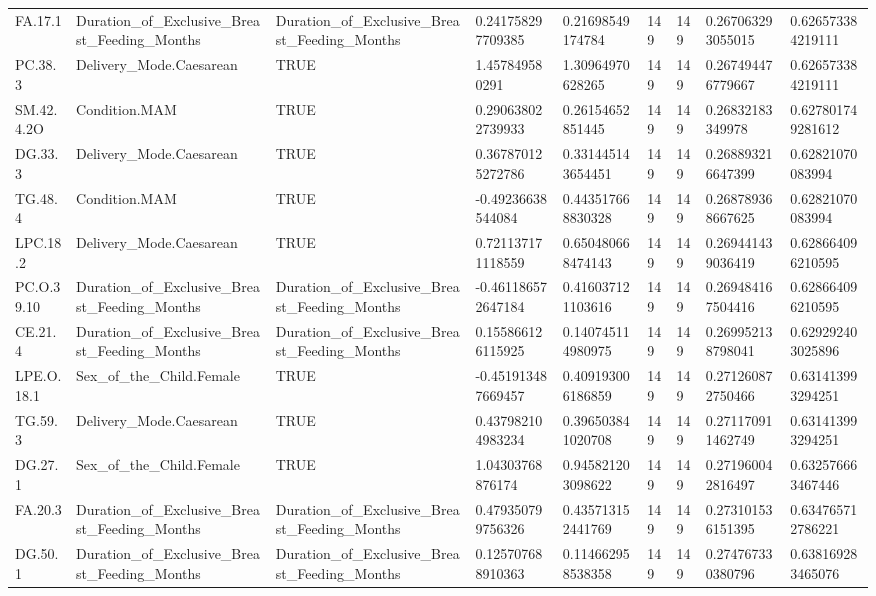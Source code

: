 \begin{longtable}{lllllllll}
FA.17.1 & Duration\_of\_Exclusive\_Breast\_Feeding\_Months & Duration\_of\_Exclusive\_Breast\_Feeding\_Months & 0.241758297709385 & 0.21698549174784 & 149 & 149 & 0.267063293055015 & 0.626573384219111 \\
PC.38.3 & Delivery\_Mode.Caesarean & TRUE & 1.457849580291 & 1.30964970628265 & 149 & 149 & 0.267494476779667 & 0.626573384219111 \\
SM.42.4.2O & Condition.MAM & TRUE & 0.290638022739933 & 0.26154652851445 & 149 & 149 & 0.26832183349978 & 0.627801749281612 \\
DG.33.3 & Delivery\_Mode.Caesarean & TRUE & 0.367870125272786 & 0.331445143654451 & 149 & 149 & 0.268893216647399 & 0.62821070083994 \\
TG.48.4 & Condition.MAM & TRUE & -0.49236638544084 & 0.443517668830328 & 149 & 149 & 0.268789368667625 & 0.62821070083994 \\
LPC.18.2 & Delivery\_Mode.Caesarean & TRUE & 0.721137171118559 & 0.650480668474143 & 149 & 149 & 0.269441439036419 & 0.628664096210595 \\
PC.O.39.10 & Duration\_of\_Exclusive\_Breast\_Feeding\_Months & Duration\_of\_Exclusive\_Breast\_Feeding\_Months & -0.461186572647184 & 0.416037121103616 & 149 & 149 & 0.269484167504416 & 0.628664096210595 \\
CE.21.4 & Duration\_of\_Exclusive\_Breast\_Feeding\_Months & Duration\_of\_Exclusive\_Breast\_Feeding\_Months & 0.155866126115925 & 0.140745114980975 & 149 & 149 & 0.269952138798041 & 0.629292403025896 \\
LPE.O.18.1 & Sex\_of\_the\_Child.Female & TRUE & -0.451913487669457 & 0.409193006186859 & 149 & 149 & 0.271260872750466 & 0.631413993294251 \\
TG.59.3 & Delivery\_Mode.Caesarean & TRUE & 0.437982104983234 & 0.396503841020708 & 149 & 149 & 0.271170911462749 & 0.631413993294251 \\
DG.27.1 & Sex\_of\_the\_Child.Female & TRUE & 1.04303768876174 & 0.945821203098622 & 149 & 149 & 0.271960042816497 & 0.632576663467446 \\
FA.20.3 & Duration\_of\_Exclusive\_Breast\_Feeding\_Months & Duration\_of\_Exclusive\_Breast\_Feeding\_Months & 0.479350799756326 & 0.435713152441769 & 149 & 149 & 0.273101536151395 & 0.634765712786221 \\
DG.50.1 & Duration\_of\_Exclusive\_Breast\_Feeding\_Months & Duration\_of\_Exclusive\_Breast\_Feeding\_Months & 0.125707688910363 & 0.114662958538358 & 149 & 149 & 0.274767330380796 & 0.638169283465076 \\

\end{longtable}
